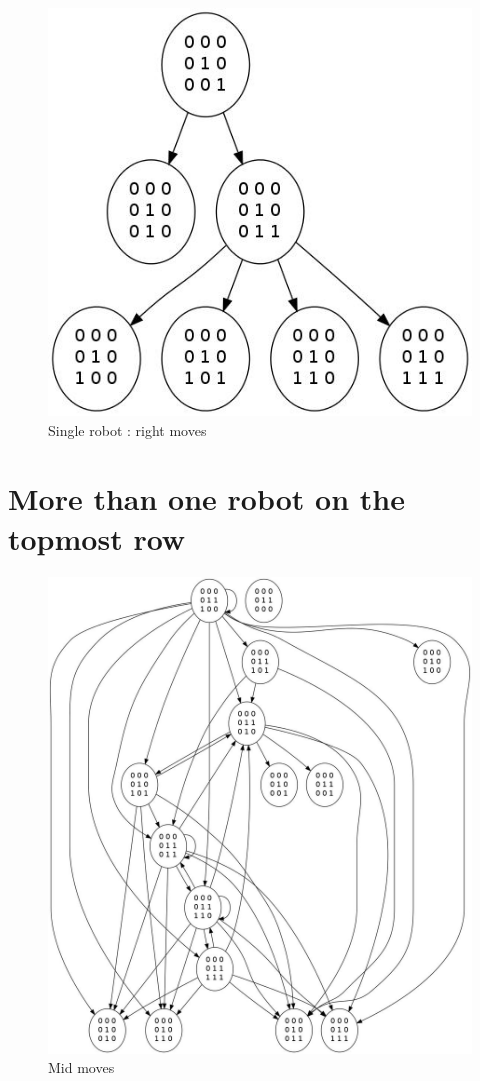 \documentclass[11pt, a4paper]{article}
\theoremstyle{plain}
\theoremstyle{definition}
\theoremstyle{remark}
\begin{document}
\begin{figure}
\includegraphics[scale=0.50]{graph_single_right.jpg}
\caption{Single robot : right moves}
\label{graph:right}
\end{figure}

\section{More than one robot on the topmost row}

\begin{figure}
\includegraphics[scale=0.50]{graph_leftmost_mid.jpg}
\caption{Mid moves}
\label{graph:leftmost_mid}
\end{figure}
\end{document}
